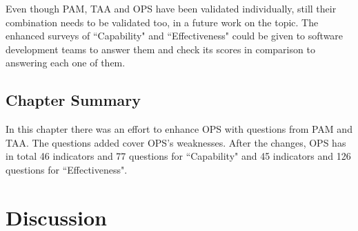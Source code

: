

Even though \ac{PAM}, \ac{TAA} and \ac{OPS} have been validated individually, still their combination needs to be validated too, in a future work on the topic. The enhanced surveys of ``Capability" and ``Effectiveness" could be given to software development teams to answer them and check its scores in comparison to answering each one of them.  

\section{Chapter Summary}
In this chapter there was an effort to enhance \ac{OPS} with questions from \ac{PAM} and \ac{TAA}. The questions added cover \ac{OPS}'s weaknesses. After the changes, \ac{OPS} has in total 46 indicators and 77 questions for ``Capability" and 45 indicators and 126 questions for ``Effectiveness".


\chapter{Discussion}
\label{ch:discussion}







